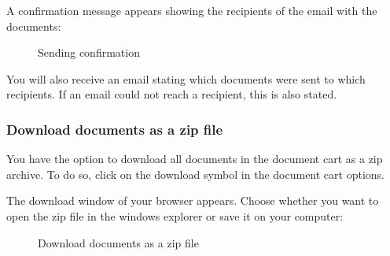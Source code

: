 \vspace{\baselineskip}

A confirmation message appears showing the recipients of the email with the documents:

\begin{figure}[H]
\caption{Sending confirmation}
\end{figure}

You will also receive an email stating which documents were sent to which recipients. If an email could not reach a recipient, this is also stated.

\vspace{\baselineskip}

\subsubsection{Download documents as a zip file}

You have the option to download all documents in the document cart as a zip archive. To do so, click on the download symbol in the document cart options.

\vspace{\baselineskip}

The download window of your browser appears. Choose whether you want to open the zip file in the windows explorer or save it on your computer:

\begin{figure}[H]
\caption{Download documents as a zip file}
\end{figure}

